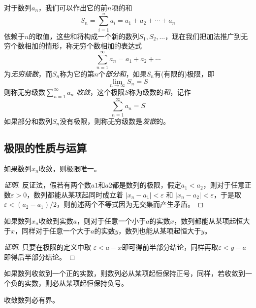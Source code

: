 \begin{example}[无穷级数的和]
  对于数列$a_n$，我们可以作出它的前$n$项的和
  \[ S_n = \sum_{i=1}^n a_i = a_1 + a_2 + \cdots + a_n \]
  依赖于$n$的取值，这些和将构成一个新的数列$S_1,S_2,\ldots$，现在我们把加法推广到无穷个数相加的情形，称无穷个数相加的表达式
  \[ \sum_{n=1}^{\infty} a_n = a_1 + a_2 + \cdots  \]
  为\emph{无穷级数}，而$S_n$称为它的第$n$个\emph{部分和}，如果$S_n$有(有限的)极限，即
  \[ \lim\limits_{n \to \infty} S_n = S \]
  则称无穷级数$\sum\limits_{n=1}^{\infty} a_n$ \emph{收敛}，这个极限$S$称为级数的\emph{和}，记作
  \[ \sum_{n=1}^{\infty} a_n = S \]
  如果部分和数列$S_n$没有极限，则称无穷级数是\emph{发散}的。
\end{example}

\subsection{极限的性质与运算}
\label{sec:properties-and-operation-of-limit}

\begin{theorem}[极限唯一性]
  如果数列$x_n$收敛，则极限唯一。
\end{theorem}

\begin{proof}[证明]
  反证法，假若有两个数$a1$和$a2$都是数列的极限，假定$a_1<a_2$，则对于任意正数$\varepsilon > 0$，数列都能从某项起同时成立着 $|x_n-a_1| < \varepsilon$ 和 $|x_n-a_2| < \varepsilon$，于是取$\varepsilon < (a_2-a_1)/2$，则前述两个不等式因为无交集而产生矛盾。
\end{proof}

\begin{theorem}
  如果数列$x_n$收敛到实数$a$，则对于任意一个小于$a$的实数$x$，数列都能从某项起恒大于$x$，同样对于任意一个大于$a$的实数$y$，数列也能从某项起恒大于$y$。
\end{theorem}

\begin{proof}[证明]
  只要在极限的定义中取 $\varepsilon < a-x$即可得前半部分结论，同样再取$\varepsilon < y-a$即得后半部分结论。
\end{proof}

\begin{inference}[保号性]
  如果数列收敛到一个正的实数，则数列必从某项起恒保持正号，同样，若收敛到一个负的实数，则必从某项起恒保持负号。
\end{inference}


\begin{theorem}[收敛数列的有界性]
  收敛数列必有界。
\end{theorem}

